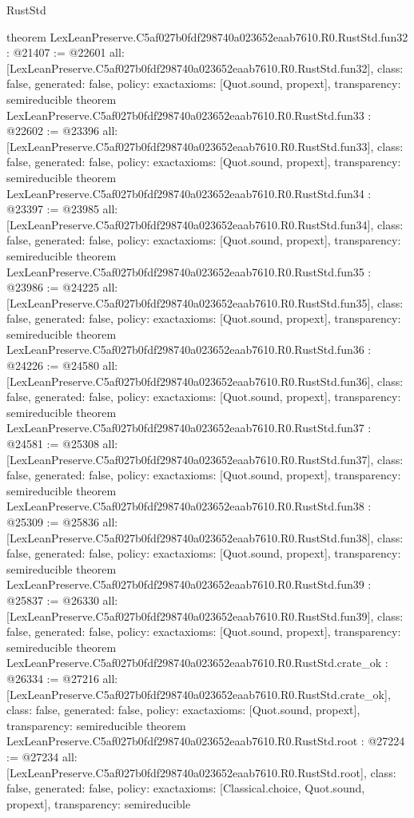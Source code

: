 \begin{lexlean}{RustStd}
\begin{coremodule}
{}
theorem LexLeanPreserve.C5af027b0fdf298740a023652eaab7610.R0.RustStd.fun32 : @21407 := @22601 {
  all: [LexLeanPreserve.C5af027b0fdf298740a023652eaab7610.R0.RustStd.fun32],
  class: false,
  generated: false,
  policy: exact{axioms: [Quot.sound, propext]},
  transparency: semireducible
}
theorem LexLeanPreserve.C5af027b0fdf298740a023652eaab7610.R0.RustStd.fun33 : @22602 := @23396 {
  all: [LexLeanPreserve.C5af027b0fdf298740a023652eaab7610.R0.RustStd.fun33],
  class: false,
  generated: false,
  policy: exact{axioms: [Quot.sound, propext]},
  transparency: semireducible
}
theorem LexLeanPreserve.C5af027b0fdf298740a023652eaab7610.R0.RustStd.fun34 : @23397 := @23985 {
  all: [LexLeanPreserve.C5af027b0fdf298740a023652eaab7610.R0.RustStd.fun34],
  class: false,
  generated: false,
  policy: exact{axioms: [Quot.sound, propext]},
  transparency: semireducible
}
theorem LexLeanPreserve.C5af027b0fdf298740a023652eaab7610.R0.RustStd.fun35 : @23986 := @24225 {
  all: [LexLeanPreserve.C5af027b0fdf298740a023652eaab7610.R0.RustStd.fun35],
  class: false,
  generated: false,
  policy: exact{axioms: [Quot.sound, propext]},
  transparency: semireducible
}
theorem LexLeanPreserve.C5af027b0fdf298740a023652eaab7610.R0.RustStd.fun36 : @24226 := @24580 {
  all: [LexLeanPreserve.C5af027b0fdf298740a023652eaab7610.R0.RustStd.fun36],
  class: false,
  generated: false,
  policy: exact{axioms: [Quot.sound, propext]},
  transparency: semireducible
}
theorem LexLeanPreserve.C5af027b0fdf298740a023652eaab7610.R0.RustStd.fun37 : @24581 := @25308 {
  all: [LexLeanPreserve.C5af027b0fdf298740a023652eaab7610.R0.RustStd.fun37],
  class: false,
  generated: false,
  policy: exact{axioms: [Quot.sound, propext]},
  transparency: semireducible
}
theorem LexLeanPreserve.C5af027b0fdf298740a023652eaab7610.R0.RustStd.fun38 : @25309 := @25836 {
  all: [LexLeanPreserve.C5af027b0fdf298740a023652eaab7610.R0.RustStd.fun38],
  class: false,
  generated: false,
  policy: exact{axioms: [Quot.sound, propext]},
  transparency: semireducible
}
theorem LexLeanPreserve.C5af027b0fdf298740a023652eaab7610.R0.RustStd.fun39 : @25837 := @26330 {
  all: [LexLeanPreserve.C5af027b0fdf298740a023652eaab7610.R0.RustStd.fun39],
  class: false,
  generated: false,
  policy: exact{axioms: [Quot.sound, propext]},
  transparency: semireducible
}
theorem LexLeanPreserve.C5af027b0fdf298740a023652eaab7610.R0.RustStd.crate_ok : @26334 := @27216 {
  all: [LexLeanPreserve.C5af027b0fdf298740a023652eaab7610.R0.RustStd.crate_ok],
  class: false,
  generated: false,
  policy: exact{axioms: [Quot.sound, propext]},
  transparency: semireducible
}
theorem LexLeanPreserve.C5af027b0fdf298740a023652eaab7610.R0.RustStd.root : @27224 := @27234 {
  all: [LexLeanPreserve.C5af027b0fdf298740a023652eaab7610.R0.RustStd.root],
  class: false,
  generated: false,
  policy: exact{axioms: [Classical.choice, Quot.sound, propext]},
  transparency: semireducible
}


\end{coremodule}
\end{lexlean}
